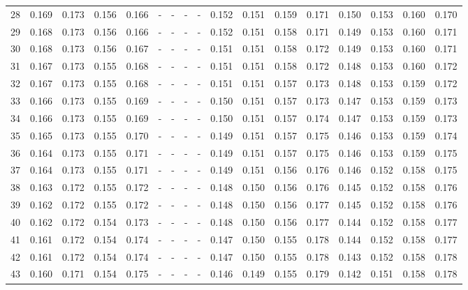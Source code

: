 \documentclass{report}
\begin{document}
\begin{appendices}
\begin{table}
\begin{tabular}{|c|cccc|cccc|cccc|cccc|}
28 & 0.169 & 0.173 & 0.156 & 0.166 &   -   &   -   &   -   &   -   & 0.152 & 0.151 & 0.159 & 0.171 & 0.150 & 0.153 & 0.160 & 0.170\\
29 & 0.168 & 0.173 & 0.156 & 0.166 &   -   &   -   &   -   &   -   & 0.152 & 0.151 & 0.158 & 0.171 & 0.149 & 0.153 & 0.160 & 0.171\\
30 & 0.168 & 0.173 & 0.156 & 0.167 &   -   &   -   &   -   &   -   & 0.151 & 0.151 & 0.158 & 0.172 & 0.149 & 0.153 & 0.160 & 0.171\\
31 & 0.167 & 0.173 & 0.155 & 0.168 &   -   &   -   &   -   &   -   & 0.151 & 0.151 & 0.158 & 0.172 & 0.148 & 0.153 & 0.160 & 0.172\\
32 & 0.167 & 0.173 & 0.155 & 0.168 &   -   &   -   &   -   &   -   & 0.151 & 0.151 & 0.157 & 0.173 & 0.148 & 0.153 & 0.159 & 0.172\\
33 & 0.166 & 0.173 & 0.155 & 0.169 &   -   &   -   &   -   &   -   & 0.150 & 0.151 & 0.157 & 0.173 & 0.147 & 0.153 & 0.159 & 0.173\\
34 & 0.166 & 0.173 & 0.155 & 0.169 &   -   &   -   &   -   &   -   & 0.150 & 0.151 & 0.157 & 0.174 & 0.147 & 0.153 & 0.159 & 0.173\\
35 & 0.165 & 0.173 & 0.155 & 0.170 &   -   &   -   &   -   &   -   & 0.149 & 0.151 & 0.157 & 0.175 & 0.146 & 0.153 & 0.159 & 0.174\\
36 & 0.164 & 0.173 & 0.155 & 0.171 &   -   &   -   &   -   &   -   & 0.149 & 0.151 & 0.157 & 0.175 & 0.146 & 0.153 & 0.159 & 0.175\\
37 & 0.164 & 0.173 & 0.155 & 0.171 &   -   &   -   &   -   &   -   & 0.149 & 0.151 & 0.156 & 0.176 & 0.146 & 0.152 & 0.158 & 0.175\\
38 & 0.163 & 0.172 & 0.155 & 0.172 &   -   &   -   &   -   &   -   & 0.148 & 0.150 & 0.156 & 0.176 & 0.145 & 0.152 & 0.158 & 0.176\\
39 & 0.162 & 0.172 & 0.155 & 0.172 &   -   &   -   &   -   &   -   & 0.148 & 0.150 & 0.156 & 0.177 & 0.145 & 0.152 & 0.158 & 0.176\\
40 & 0.162 & 0.172 & 0.154 & 0.173 &   -   &   -   &   -   &   -   & 0.148 & 0.150 & 0.156 & 0.177 & 0.144 & 0.152 & 0.158 & 0.177\\
41 & 0.161 & 0.172 & 0.154 & 0.174 &   -   &   -   &   -   &   -   & 0.147 & 0.150 & 0.155 & 0.178 & 0.144 & 0.152 & 0.158 & 0.177\\
42 & 0.161 & 0.172 & 0.154 & 0.174 &   -   &   -   &   -   &   -   & 0.147 & 0.150 & 0.155 & 0.178 & 0.143 & 0.152 & 0.158 & 0.178\\
43 & 0.160 & 0.171 & 0.154 & 0.175 &   -   &   -   &   -   &   -   & 0.146 & 0.149 & 0.155 & 0.179 & 0.142 & 0.151 & 0.158 & 0.178\\

\end{tabular}
\end{table}
\end{appendices}
\end{document}
